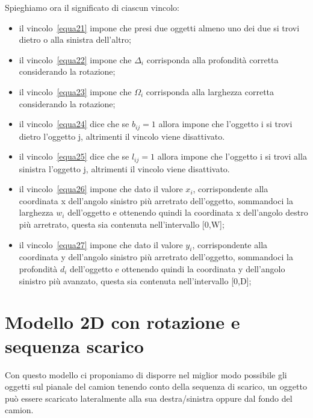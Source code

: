 Spieghiamo ora il significato di ciascun vincolo:
\begin{itemize}
	\item il vincolo~\eqref{equa21} impone che presi due oggetti almeno uno dei due si trovi dietro o alla sinistra dell'altro;
	\item il vincolo~\eqref{equa22} impone che $\Delta_i$ corrisponda alla profondità corretta considerando la rotazione;
	\item il vincolo~\eqref{equa23} impone che $\Omega_i$ corrisponda alla larghezza corretta considerando la rotazione;
	\item il vincolo~\eqref{equa24} dice che se $b_{ij} = 1$ allora impone che l'oggetto i si trovi dietro l'oggetto j, altrimenti il vincolo viene disattivato.
	\item il vincolo~\eqref{equa25} dice che se $l_{ij} = 1$ allora impone che l'oggetto i si trovi alla sinistra l'oggetto j, altrimenti il vincolo viene disattivato. 
	\item il vincolo~\eqref{equa26} impone che dato il valore $x_i$, corrispondente alla coordinata x dell'angolo sinistro più arretrato dell'oggetto, sommandoci la larghezza $w_i$ dell'oggetto e ottenendo quindi la coordinata x dell'angolo destro più arretrato, questa sia contenuta nell'intervallo [0,W];
	\item il vincolo~\eqref{equa27} impone che dato il valore $y_i$, corrispondente alla coordinata y dell'angolo sinistro più arretrato dell'oggetto, sommandoci la profondità $d_i$ dell'oggetto e ottenendo quindi la coordinata y dell'angolo sinistro più avanzato, questa sia contenuta nell'intervallo [0,D];
\end{itemize}

\newpage
\section{Modello 2D con rotazione e sequenza scarico}
Con questo modello ci proponiamo di disporre nel miglior modo possibile gli oggetti sul pianale del camion tenendo conto della sequenza di scarico, un oggetto può essere scaricato lateralmente alla sua destra/sinistra oppure dal fondo del camion.

